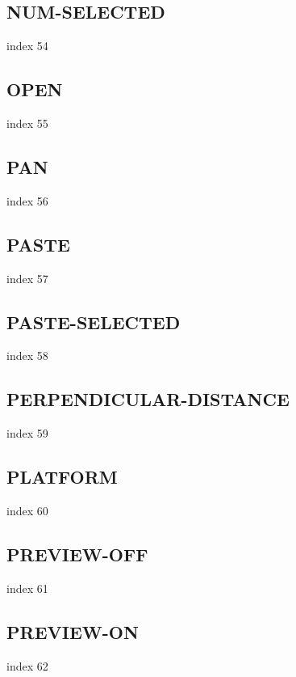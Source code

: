 \documentclass[11pt]{report}
\begin{document}
\subsection{NUM-SELECTED}

index 54

\subsection{OPEN}

index 55

\subsection{PAN}

index 56

\subsection{PASTE}

index 57

\subsection{PASTE-SELECTED}

index 58

\subsection{PERPENDICULAR-DISTANCE}

index 59

\subsection{PLATFORM}

index 60

\subsection{PREVIEW-OFF}

index 61

\subsection{PREVIEW-ON}

index 62
\end{document}

